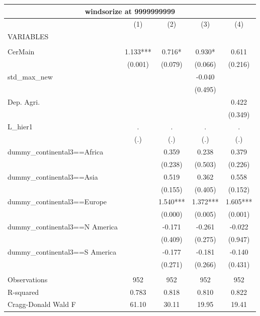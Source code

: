 \documentclass[12pt,a4paper]{article}
\begin{document}
\begin{tabular}{lcccc}
\multicolumn{5}{c}{windsorize at 9999999999} \\ \hline
 & (1) & (2) & (3) & (4) \\
VARIABLES &  &  &  &  \\ \hline
 &  &  &  &  \\
CerMain & 1.133*** & 0.716* & 0.930* & 0.611 \\
 & (0.001) & (0.079) & (0.066) & (0.216) \\
std\_max\_new &  &  & -0.040 &  \\
 &  &  & (0.495) &  \\
Dep. Agri. &  &  &  & 0.422 \\
 &  &  &  & (0.349) \\
L\_hier1 & . & . & . & . \\
 & (.) & (.) & (.) & (.) \\
dummy\_continental3==Africa &  & 0.359 & 0.238 & 0.379 \\
 &  & (0.238) & (0.503) & (0.226) \\
dummy\_continental3==Asia &  & 0.519 & 0.362 & 0.558 \\
 &  & (0.155) & (0.405) & (0.152) \\
dummy\_continental3==Europe &  & 1.540*** & 1.372*** & 1.605*** \\
 &  & (0.000) & (0.005) & (0.001) \\
dummy\_continental3==N America &  & -0.171 & -0.261 & -0.022 \\
 &  & (0.409) & (0.275) & (0.947) \\
dummy\_continental3==S America &  & -0.177 & -0.181 & -0.140 \\
 &  & (0.271) & (0.266) & (0.431) \\
 &  &  &  &  \\
Observations & 952 & 952 & 952 & 952 \\
R-squared & 0.783 & 0.818 & 0.810 & 0.822 \\
 Cragg-Donald Wald F & 61.10 & 30.11 & 19.95 & 19.41 \\ \hline
\end{tabular}
\end{document}
